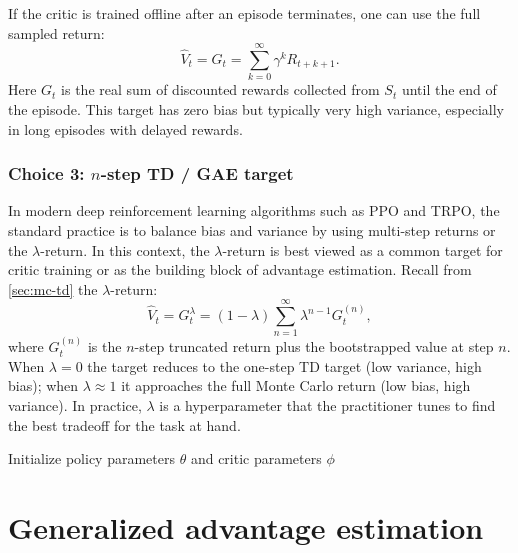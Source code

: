 \documentclass[11pt]{article}
\newcommand{\1}{\mathbf{1}}
\begin{document}
If the critic is trained offline after an episode terminates, one can use the full sampled return:
\begin{equation}
\hat V_t = G_t = \sum_{k=0}^{\infty}\gamma^k R_{t+k+1}.
\end{equation}
Here $G_t$ is the real sum of discounted rewards collected from $S_t$ until the end of the episode. This target has zero bias but typically very high variance, especially in long episodes with delayed rewards.

\subsubsection*{Choice 3: $n$-step TD / GAE target}

In modern deep reinforcement learning algorithms such as PPO and TRPO, the standard practice is to balance bias and variance by using multi-step returns or the $\lambda$-return. In this context, the $\lambda$-return is best viewed as a common target for critic training or as the building block of advantage estimation. Recall from \cref{sec:mc-td} the $\lambda$-return:
\begin{equation}
\hat V_t = G_t^{\lambda} = (1-\lambda)\sum_{n=1}^{\infty}\lambda^{n-1}G_t^{(n)},
\end{equation}
where $G_t^{(n)}$ is the $n$-step truncated return plus the bootstrapped value at step $n$. When $\lambda=0$ the target reduces to the one-step TD target (low variance, high bias); when $\lambda\approx 1$ it approaches the full Monte Carlo return (low bias, high variance). In practice, $\lambda$ is a hyperparameter that the practitioner tunes to find the best tradeoff for the task at hand.

\begin{algorithm}[htbp]
\caption{One-step actor--critic}
Initialize policy parameters $\theta$ and critic parameters $\phi$\;
\end{algorithm}

\section{Generalized advantage estimation}
\end{document}
